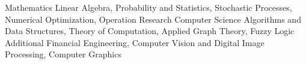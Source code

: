 \begin{cvskills}
  \cvskill
    {Mathematics}
    {Linear Algebra, Probability and Statistics, Stochastic Processes, Numerical Optimization, Operation Research}
  \cvskill
    {Computer Science}
    {Algorithms and Data Structures, Theory of Computation, Applied Graph Theory, Fuzzy Logic}
  \cvskill
    {Additional}
    {Financial Engineering, Computer Vision and Digital Image Processing, Computer Graphics}
\end{cvskills}